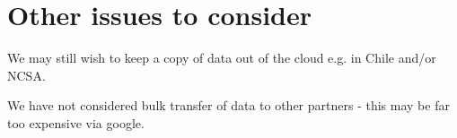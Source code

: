 
\section{Other issues to consider}
We may still wish to keep a copy of data out of the cloud e.g. in Chile and/or NCSA.

We have not considered bulk transfer of data to other partners - this may be far too expensive via google.

~

